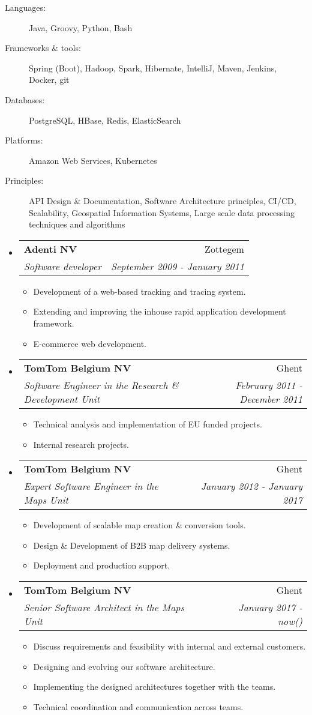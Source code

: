 \documentclass[letterpaper,11pt]{article}
\makeatletter
\newcommand{\resitem}[1]{\item #1 \vspace{-2pt}}
\newcommand{\resheading}[1]{{\large \parashade[.9]{sharpcorners}{\textbf{#1 \vphantom{p\^{E}}}}}}
\newcommand{\ressubheading}[4]{
\begin{tabular*}{6.5in}{l@{\extracolsep{\fill}}r}
		\textbf{#1} & #2 \\
		\textit{#3} & \textit{#4} \\
\end{tabular*}\vspace{-6pt}}
\makeatother
\begin{document}
\begin{description}
	\item[Languages:]
	Java, Groovy, Python, Bash
	\item[Frameworks \& tools:]
	Spring (Boot), Hadoop, Spark, Hibernate, IntelliJ, Maven, Jenkins, Docker, git
	\item[Databases:]
	PostgreSQL, HBase, Redis, ElasticSearch
	\item[Platforms:]
	Amazon Web Services, Kubernetes
	\item[Principles:]
	API Design \& Documentation, Software Architecture principles, CI/CD, Scalability, Geospatial Information Systems, Large scale data processing techniques and algorithms
\end{description}


\clearpage

\resheading{Work Experience}
\begin{itemize}

\item 
	\ressubheading{Adenti NV}{Zottegem}{Software developer}{September 2009 - January 2011}
	\begin{itemize}
		\resitem{Development of a web-based tracking and tracing system.}
		\resitem{Extending and improving the inhouse rapid application development framework.}
		\resitem{E-commerce web development.}
	\end{itemize}

\item
	\ressubheading{TomTom Belgium NV}{Ghent}{Software Engineer in the Research \& Development Unit}{February 2011 - December 2011}
	\begin{itemize}
		\resitem{Technical analysis and implementation of EU funded projects.}
		\resitem{Internal research projects.}
	\end{itemize}

\item
	\ressubheading{TomTom Belgium NV}{Ghent}{Expert Software Engineer in the Maps Unit}{January 2012 - January 2017}
	\begin{itemize}
		\resitem{Development of scalable map creation \& conversion tools.}
		\resitem{Design \& Development of B2B map delivery systems.}
		\resitem{Deployment and production support.}
	\end{itemize}

\item
\ressubheading{TomTom Belgium NV}{Ghent}{Senior Software Architect in the Maps Unit}{January 2017 - now()}
\begin{itemize}
	\resitem{Discuss requirements and feasibility with internal and external customers.}		
	\resitem{Designing and evolving our software architecture.}	
	\resitem{Implementing the designed architectures together with the teams.}
	\resitem{Technical coordination and communication across teams.}
\end{itemize}
	
\end{itemize}
\end{document}

